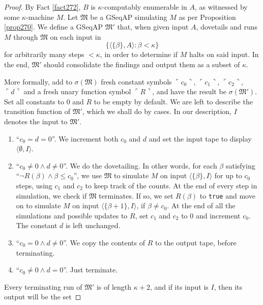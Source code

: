 \documentclass[12pt]{article}
\numberwithin{equation}{section}
\begin{document}
\begin{proof}
By Fact \ref{fact272}, $B$ is $\kappa$-computably enumerable in $A$, as witnessed by some $\kappa$-machine $M$. Let $\mathfrak{M}$ be a GSeqAP simulating $M$ as per Proposition \ref{prop270}. We define a GSeqAP $\mathfrak{M}'$ that, when given input $A$, dovetails and runs $M$ through $\mathfrak{M}$ on each input in
\begin{equation*}
    \{\langle \{\beta\}, A \rangle : \beta < \kappa\}
\end{equation*}
for arbitrarily many steps $< \kappa$, in order to determine if $M$ halts on said input. In the end, $\mathfrak{M}'$ should consolidate the findings and output them as a subset of $\kappa$.

More formally, add to $\sigma(\mathfrak{M})$ fresh constant symbols $\ulcorner c_0 \urcorner$, $\ulcorner c_1 \urcorner$, $\ulcorner c_2 \urcorner$, $\ulcorner d \urcorner$ and a fresh unary function symbol $\ulcorner R \urcorner$, and have the result be $\sigma(\mathfrak{M}')$. Set all constants to $0$ and $R$ to be empty by default. We are left to describe the transition function of $\mathfrak{M}'$, which we shall do by cases. In our description, $I$ denotes the input to $\mathfrak{M}'$.
\begin{enumerate}[leftmargin=60pt, label=Case \arabic*:]
    \item ``$c_0 = d = 0$''. We increment both $c_0$ and $d$ and set the input tape to display $\langle \emptyset, I \rangle$.
    \item ``$c_0 \neq 0 \wedge d \neq 0$''. We do the dovetailing. In other words, for each $\beta$ satisfying ``$\neg R(\beta) \wedge \beta \leq c_0$'', we use $\mathfrak{M}$ to simulate $M$ on input $\langle \{\beta\}, I \rangle$ for up to $c_0$ steps, using $c_1$ and $c_2$ to keep track of the counts. At the end of every step in simulation, we check if $\mathfrak{M}$ terminates. If so, we set $R(\beta)$ to \texttt{true} and move on to simulate $M$ on input $\langle \{\beta + 1\}, I \rangle$, if $\beta \neq c_0$. At the end of all the simulations and possible updates to $R$, set $c_1$ and $c_2$ to $0$ and increment $c_0$. The constant $d$ is left unchanged.
    \item\label{8340c3} ``$c_0 = 0 \wedge d \neq 0$''. We copy the contents of $R$ to the output tape, before terminating.
    \item\label{8340c4} ``$c_0 \neq 0 \wedge d = 0$''. Just terminate.
\end{enumerate}
Every terminating run of $\mathfrak{M}'$ is of length $\kappa + 2$, and if its input is $I$, then its output will be the set

\end{proof}
\end{document}
